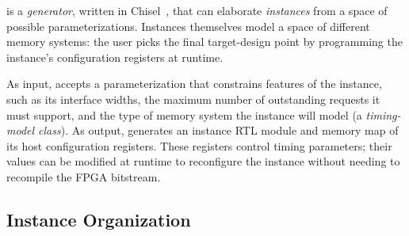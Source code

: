 \PNAME is a \textit{generator}, written in Chisel~\cite{Chisel}, that can
elaborate \textit{instances} from a space of possible parameterizations.
Instances themselves model a space of different memory systems: the user picks the
final target-design point by programming the instance's configuration registers
at runtime.

As input, \PNAME accepts a parameterization that constrains features
of the instance, such as its interface widths, the maximum number of
outstanding requests it must support, and the type of memory system the
instance will model (a \emph{timing-model class}). As output, \PNAME generates
an instance RTL module and memory map of its host configuration registers. These
registers control timing parameters; their values can be modified at runtime
to reconfigure the instance without needing to recompile the FPGA bitstream.

\subsection{Instance Organization}

